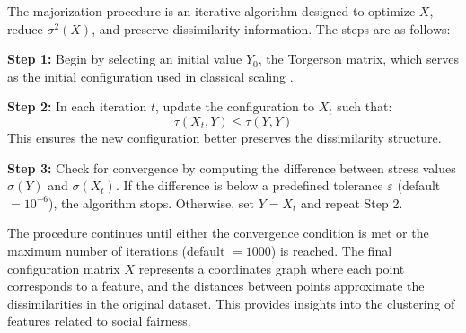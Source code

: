 The majorization procedure is an iterative algorithm designed to optimize $X$, reduce $\sigma^2(X)$, and preserve dissimilarity information. The steps are as follows:

\textbf{Step 1:} Begin by selecting an initial value $Y_0$, the Torgerson matrix, which serves as the initial configuration used in classical scaling \citep{borg2005classical}.

\textbf{Step 2:} In each iteration $t$, update the configuration to $X_t$ such that:
\[
\tau(X_t, Y) \leq \tau(Y, Y)
\]
This ensures the new configuration better preserves the dissimilarity structure.

\textbf{Step 3:} Check for convergence by computing the difference between stress values $\sigma(Y)$ and $\sigma(X_t)$. If the difference is below a predefined tolerance $\varepsilon$ (default $= 10^{-6}$), the algorithm stops. Otherwise, set $Y = X_t$ and repeat Step 2.

The procedure continues until either the convergence condition is met or the maximum number of iterations (default $= 1000$) is reached. The final configuration matrix $X$ represents a coordinates graph where each point corresponds to a feature, and the distances between points approximate the dissimilarities in the original dataset. This provides insights into the clustering of features related to social fairness.
